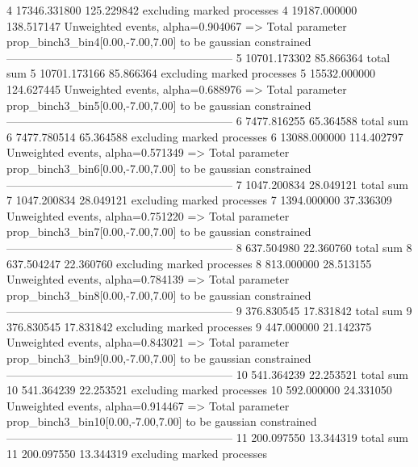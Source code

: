 4          17346.331800    125.229842      excluding marked processes    
4          19187.000000    138.517147      Unweighted events, alpha=0.904067
  => Total parameter prop_binch3_bin4[0.00,-7.00,7.00] to be gaussian constrained
------------------------------------------------------------
5          10701.173302    85.866364       total sum                     
5          10701.173166    85.866364       excluding marked processes    
5          15532.000000    124.627445      Unweighted events, alpha=0.688976
  => Total parameter prop_binch3_bin5[0.00,-7.00,7.00] to be gaussian constrained
------------------------------------------------------------
6          7477.816255     65.364588       total sum                     
6          7477.780514     65.364588       excluding marked processes    
6          13088.000000    114.402797      Unweighted events, alpha=0.571349
  => Total parameter prop_binch3_bin6[0.00,-7.00,7.00] to be gaussian constrained
------------------------------------------------------------
7          1047.200834     28.049121       total sum                     
7          1047.200834     28.049121       excluding marked processes    
7          1394.000000     37.336309       Unweighted events, alpha=0.751220
  => Total parameter prop_binch3_bin7[0.00,-7.00,7.00] to be gaussian constrained
------------------------------------------------------------
8          637.504980      22.360760       total sum                     
8          637.504247      22.360760       excluding marked processes    
8          813.000000      28.513155       Unweighted events, alpha=0.784139
  => Total parameter prop_binch3_bin8[0.00,-7.00,7.00] to be gaussian constrained
------------------------------------------------------------
9          376.830545      17.831842       total sum                     
9          376.830545      17.831842       excluding marked processes    
9          447.000000      21.142375       Unweighted events, alpha=0.843021
  => Total parameter prop_binch3_bin9[0.00,-7.00,7.00] to be gaussian constrained
------------------------------------------------------------
10         541.364239      22.253521       total sum                     
10         541.364239      22.253521       excluding marked processes    
10         592.000000      24.331050       Unweighted events, alpha=0.914467
  => Total parameter prop_binch3_bin10[0.00,-7.00,7.00] to be gaussian constrained
------------------------------------------------------------
11         200.097550      13.344319       total sum                     
11         200.097550      13.344319       excluding marked processes    
